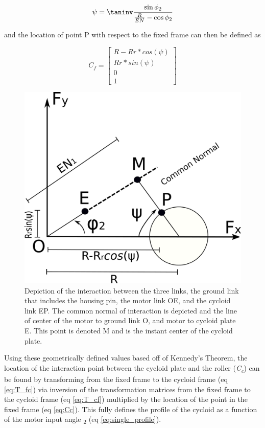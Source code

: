 \begin{equation} \label{eq:psi}
\psi = \taninv\frac{\sin\phi_2}{\frac{R}{EN} - \cos{\phi_2}}
\end{equation}

and the location of point P with respect to the fixed frame can then be defined as 

\begin{equation} \label{eq:Cf}
C_f = \left[\begin{array}{c}
		R-Rr*cos(\psi)\\
		Rr*sin(\psi)\\
		0\\
		1
		\end{array} \right]
\end{equation}


\begin{figure}[h]
   \centering
   \includegraphics[width=0.60\linewidth]{fig/single_stage_angles}
   \caption{Depiction of the interaction between the three links, the ground link that includes the housing pin, the motor link OE, and the cycloid link EP. The common normal of interaction is depicted and the line of center of the motor to ground link O, and motor to cycloid plate E. This point is denoted M and is the instant center of the cycloid plate.}
   \label{fig:single_angles}
\end{figure}

Using these geometrically defined values based off of Kennedy's Theorem, the location of the interaction point between the cycloid plate and the roller (\textit{C\textsubscript{c}}) can be found by transforming from the fixed frame to the cycloid frame (eq \ref{eq:T_fc}) via inversion of the transformation matrices from the fixed frame to the cycloid frame (eq \ref{eq:T_cf}) multiplied by the location of the point in the fixed frame (eq \ref{eq:Cc}). This fully defines the profile of the cycloid as a function of the motor input angle \textphi\textsubscript{2} (eq \ref{eq:single_profile}).

